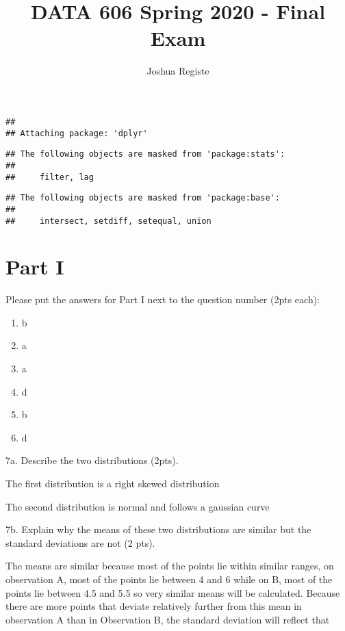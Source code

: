 \documentclass[
]{article}
\title{DATA 606 Spring 2020 - Final Exam}
\author{Joshua Registe}
\date{}
\providecommand{\tightlist}{%
  \setlength{\itemsep}{0pt}\setlength{\parskip}{0pt}}
\begin{document}
\maketitle

\begin{verbatim}
## 
## Attaching package: 'dplyr'
\end{verbatim}

\begin{verbatim}
## The following objects are masked from 'package:stats':
## 
##     filter, lag
\end{verbatim}

\begin{verbatim}
## The following objects are masked from 'package:base':
## 
##     intersect, setdiff, setequal, union
\end{verbatim}

\hypertarget{part-i}{%
\section{Part I}\label{part-i}}

Please put the answers for Part I next to the question number (2pts
each):

\begin{enumerate}
\def\labelenumi{\arabic{enumi}.}
\tightlist
\item
  b
\item
  a
\item
  a
\item
  d
\item
  b
\item
  d
\end{enumerate}

7a. Describe the two distributions (2pts).

The first distribution is a right skewed distribution

The second distribution is normal and follows a gaussian curve

7b. Explain why the means of these two distributions are similar but the
standard deviations are not (2 pts).

The means are similar because most of the points lie within similar
ranges, on observation A, most of the points lie between 4 and 6 while
on B, most of the points lie between 4.5 and 5.5 so very similar means
will be calculated. Because there are more points that deviate
relatively further from this mean in observation A than in Observation
B, the standard deviation will reflect that
\end{document}

